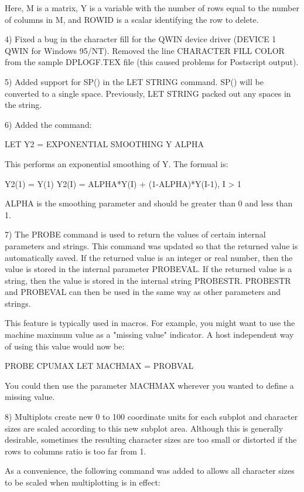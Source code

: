 {    Here, M is a matrix, Y is a variable with the number of rows
    equal to the number of columns in M, and ROWID is a scalar
    identifying the row to delete.

 4) Fixed a bug in the character fill for the QWIN device
    driver (DEVICE 1 QWIN for Windows 95/NT).  Removed the line
    CHARACTER FILL COLOR from the sample DPLOGF.TEX file (this
    caused problems for Postscript output).
  
 5) Added support for SP() in the LET STRING command.  SP() will
    be converted to a single space.  Previously, LET STRING packed
    out any spaces in the string.

 6) Added the command:

        LET Y2 = EXPONENTIAL SMOOTHING Y ALPHA

    This performs an exponential smoothing of Y.  The formual is:

        Y2(1) = Y(1)
        Y2(I) = ALPHA*Y(I) + (1-ALPHA)*Y(I-1),  I > 1

    ALPHA is the smoothing parameter and should be greater than
    0 and less than 1.

 7) The PROBE command is used to return the values of certain
    internal parameters and strings.  This command was updated
    so that the returned value is automatically saved.  If the
    returned value is an integer or real number, then the value
    is stored in the internal parameter PROBEVAL.  If the
    returned value is a string, then the value is stored in the
    internal string PROBESTR.  PROBESTR and PROBEVAL can then be
    used in the same way as other parameters and strings.

    This feature is typically used in macros.  For example, you
    might want to use the machine maximum value as a "missing
    value" indicator.  A host independent way of using this value
    would now be:

       PROBE CPUMAX
       LET MACHMAX = PROBVAL

    You could then use the parameter MACHMAX wherever you wanted
    to define a missing value.

 8) Multiplots create new 0 to 100 coordinate units for each
    subplot and character sizes are scaled according to this
    new subplot area.  Although this is generally desirable,
    sometimes the resulting character sizes are too small or
    distorted if the rows to columns ratio is too far from 1.

    As a convenience, the following command was added to allows
    all character sizes to be scaled when multiplotting is
    in effect:

}
